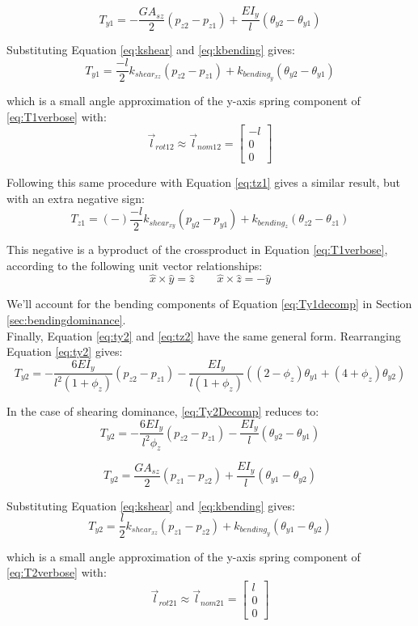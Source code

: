 {\[T_{y1} = - \dfrac{GA_{sz}}{2}(p_{z2}- p_{z1}) + \dfrac{EI_y}{l}(\theta_{y2}  - \theta_{y1})\]

Substituting Equation \ref{eq:kshear} and \ref{eq:kbending} gives:
\[T_{y1} = \dfrac{-l}{2}k_{shear_{xz}}(p_{z2}- p_{z1}) + k_{bending_y}(\theta_{y2}  - \theta_{y1})\]

which is a small angle approximation of the y-axis spring component of \ref{eq:T1verbose} with:
\[ \vec{l}_{rot12} \approx \vec{l}_{nom12} = \left[ \begin{array}{ccc}
-l\\
0\\
0
 \end{array} \right]\]
 
Following this same procedure with Equation \ref{eq:tz1} gives a similar result, but with an extra negative sign:
\[T_{z1} = (-)\dfrac{-l}{2}k_{shear_{xy}}(p_{y2}- p_{y1}) + k_{bending_z}(\theta_{z2}  - \theta_{z1})\]
 
This negative is a byproduct of the crossproduct in Equation \ref{eq:T1verbose}, according to the following unit vector relationships:
\begin{equation}\label{eq:crossUnits}
\hat{x} \times \hat{y} = \hat{z}  \qquad \hat{x} \times \hat{z} = -\hat{y}  
\end{equation}

We'll account for the bending components of Equation \ref{eq:Ty1decomp} in Section \ref{sec:bendingdominance}.\\

Finally, Equation \ref{eq:ty2} and \ref{eq:tz2} have the same general form. Rearranging Equation \ref{eq:ty2} gives:
\begin{equation}\label{eq:Ty2Decomp}
T_{y2} =  -\dfrac{6EI_y}{l^2(1+\phi_z)}(p_{z2} - p_{z1}) - \dfrac{EI_y}{l(1+\phi_z)}((2-\phi_z)\theta_{y1}  + (4+\phi_z)\theta_{y2})
\end{equation}

In the case of shearing dominance, \ref{eq:Ty2Decomp} reduces to:
\[  T_{y2} =  -\dfrac{6EI_y}{l^2\phi_z}(p_{z2} - p_{z1}) - \dfrac{EI_y}{l}(\theta_{y2}  - \theta_{y1}) \]

\[  T_{y2} =  \dfrac{GA_{sz}}{2}(p_{z1} - p_{z2}) + \dfrac{EI_y}{l}(\theta_{y1}  - \theta_{y2}) \]

Substituting Equation \ref{eq:kshear} and \ref{eq:kbending} gives:
\[  T_{y2} =  \dfrac{l}{2}k_{shear_{xz}}(p_{z1} - p_{z2}) + k_{bending_y}(\theta_{y1}  - \theta_{y2}) \]

which is a small angle approximation of the y-axis spring component of \ref{eq:T2verbose} with:
\[ \vec{l}_{rot21} \approx \vec{l}_{nom21} = \left[ \begin{array}{ccc}
l\\
0\\
0
 \end{array} \right]\]

}
